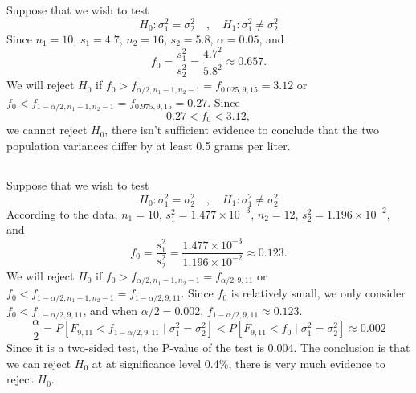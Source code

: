 \documentclass[11pt,a4paper]{article}
\begin{document}
Suppose that we wish to test
$$H_0:\sigma_1^2=\sigma_2^2\quad,\quad H_1:\sigma_1^2\neq\sigma_2^2$$
Since $n_1=10$, $s_1=4.7$, $n_2=16$, $s_2=5.8$, $\alpha=0.05$, and
$$f_0=\frac{s_1^2}{s_2^2}=\frac{4.7^2}{5.8^2}\approx0.657.$$
We will reject $H_0$ if $f_0>f_{\alpha/2,n_1-1,n_2-1}=f_{0.025,9,15}=3.12$ or $f_0<f_{1-\alpha/2,n_1-1,n_2-1}=f_{0.975,9,15}=0.27$. Since 
$$0.27<f_0<3.12,$$
we cannot reject $H_0$, there isn't sufficient evidence to conclude that the two population variances differ by at least 0.5 grams per liter.

\subsection{}
Suppose that we wish to test
$$H_0:\sigma_1^2=\sigma_2^2\quad,\quad H_1:\sigma_1^2\neq\sigma_2^2$$
According to the data, $n_1=10$, $s_1^2=1.477\times10^{-3}$, $n_2=12$, $s_2^2=1.196\times10^{-2}$, and 
$$f_0=\frac{s_1^2}{s_2^2}=\frac{1.477\times10^{-3}}{1.196\times10^{-2}}\approx0.123.$$
We will reject $H_0$ if $f_0>f_{\alpha/2,n_1-1,n_2-1}=f_{\alpha/2,9,11}$ or $f_0<f_{1-\alpha/2,n_1-1,n_2-1}=f_{1-\alpha/2,9,11}$. Since $f_0$ is relatively small, we only consider $f_0<f_{1-\alpha/2,9,11}$, and when $\alpha/2=0.002$, $f_{1-\alpha/2,9,11}\approx 0.123$.
$$\frac{\alpha}{2}=P[F_{9,11}<f_{1-\alpha/2,9,11}\mid \sigma_1^2=\sigma_2^2]< P[F_{9,11}<f_0\mid \sigma_1^2=\sigma_2^2]\approx0.002$$
Since it is a two-sided test, the P-value of the test is 0.004. The conclusion is that we can reject $H_0$ at at significance level 0.4\%, there is very much evidence to reject $H_0$.
\end{document}
